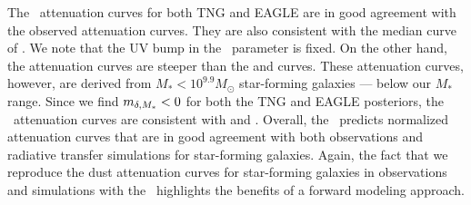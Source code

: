 The \eda~attenuation curves for both TNG and EAGLE are in good agreement with the
observed \cite{salim2018} attenuation curves. They are also consistent with the
median curve of \cite{narayanan2018}. We note that the UV bump in the
\eda~parameter is fixed. On the other hand, the \eda attenuation curves are
steeper than the \cite{calzetti2000} and \cite{battisti2017} curves. These
attenuation curves, however, are derived from $M_* < 10^{9.9}M_\odot$ star-forming 
galaxies --- below our $M_*$ range. Since we find $m_{\delta,M_*} < 0$ for both
the TNG and EAGLE posteriors, the \eda~attenuation curves are consistent with 
\cite{calzetti2000} and \cite{battisti2017}. Overall, the \eda~predicts
normalized attenuation curves that are in good agreement with both observations and
radiative transfer simulations for star-forming galaxies. Again, the fact that
we reproduce the dust attenuation curves for star-forming galaxies in
observations and simulations with the \eda~highlights the benefits of a forward
modeling approach. 







